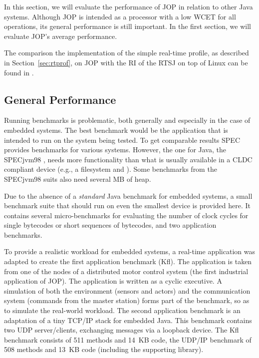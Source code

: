 In this section, we will evaluate the performance of JOP in relation
to other Java systems. Although JOP is intended as a processor with
a low WCET for all operations, its general performance is still
important. In the first section, we will evaluate JOP's average
performance.


The comparison the implementation of the simple real-time profile,
as described in Section~\ref{sec:rtprof}, on JOP with the RI of the
RTSJ on top of Linux can be found in \cite{jop:rtjava}.

\subsection{General Performance}

Running benchmarks is problematic, both generally and especially in
the case of embedded systems. The best benchmark would be the
application that is intended to run on the system being tested. To
get comparable results SPEC provides benchmarks for various systems.
However, the one for Java, the SPECjvm98 \cite{SPECJvm98}, needs
more functionality than what is usually available in a CLDC
compliant device (e.g., a filesystem and ). Some
benchmarks from the SPECjvm98 suits also need several MB of heap.

Due to the absence of a \emph{standard} Java benchmark for embedded
systems, a small benchmark suite that should run on even the
smallest device is provided here. It contains several
micro-benchmarks for evaluating the number of clock cycles for
single bytecodes or short sequences of bytecodes, and two
application benchmarks.

To provide a realistic workload for embedded systems, a real-time
application was adapted to create the first application benchmark
(Kfl). The application is taken from one of the nodes of a
distributed motor control system \cite{jop:wises03} (the first
industrial application of JOP). The application is written as a
cyclic executive. A simulation of both the environment (sensors and
actors) and the communication system (commands from the master
station) forms part of the benchmark, so as to simulate the
real-world workload. The second application benchmark is an
adaptation of a tiny TCP/IP stack for embedded Java. This benchmark
contains two UDP server/clients, exchanging messages via a loopback
device. The Kfl benchmark consists of 511 methods and 14~KB code,
the UDP/IP benchmark of 508 methods and 13~KB code (including the
supporting library).

